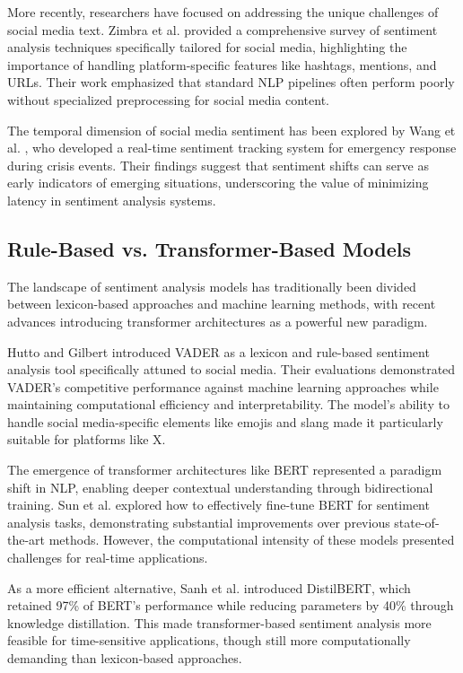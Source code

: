 \documentclass[conference]{IEEEtran}
\begin{document}
More recently, researchers have focused on addressing the unique challenges of social media text. Zimbra et al. \cite{zimbra2018state} provided a comprehensive survey of sentiment analysis techniques specifically tailored for social media, highlighting the importance of handling platform-specific features like hashtags, mentions, and URLs. Their work emphasized that standard NLP pipelines often perform poorly without specialized preprocessing for social media content.

The temporal dimension of social media sentiment has been explored by Wang et al. \cite{wang2020real}, who developed a real-time sentiment tracking system for emergency response during crisis events. Their findings suggest that sentiment shifts can serve as early indicators of emerging situations, underscoring the value of minimizing latency in sentiment analysis systems.

\subsection{Rule-Based vs. Transformer-Based Models}
The landscape of sentiment analysis models has traditionally been divided between lexicon-based approaches and machine learning methods, with recent advances introducing transformer architectures as a powerful new paradigm.

Hutto and Gilbert \cite{hutto2014vader} introduced VADER as a lexicon and rule-based sentiment analysis tool specifically attuned to social media. Their evaluations demonstrated VADER's competitive performance against machine learning approaches while maintaining computational efficiency and interpretability. The model's ability to handle social media-specific elements like emojis and slang made it particularly suitable for platforms like X.

The emergence of transformer architectures like BERT \cite{devlin2019bert} represented a paradigm shift in NLP, enabling deeper contextual understanding through bidirectional training. Sun et al. \cite{sun2019fine} explored how to effectively fine-tune BERT for sentiment analysis tasks, demonstrating substantial improvements over previous state-of-the-art methods. However, the computational intensity of these models presented challenges for real-time applications.

As a more efficient alternative, Sanh et al. \cite{sanh2019distilbert} introduced DistilBERT, which retained 97\% of BERT's performance while reducing parameters by 40\% through knowledge distillation. This made transformer-based sentiment analysis more feasible for time-sensitive applications, though still more computationally demanding than lexicon-based approaches.
\end{document}
